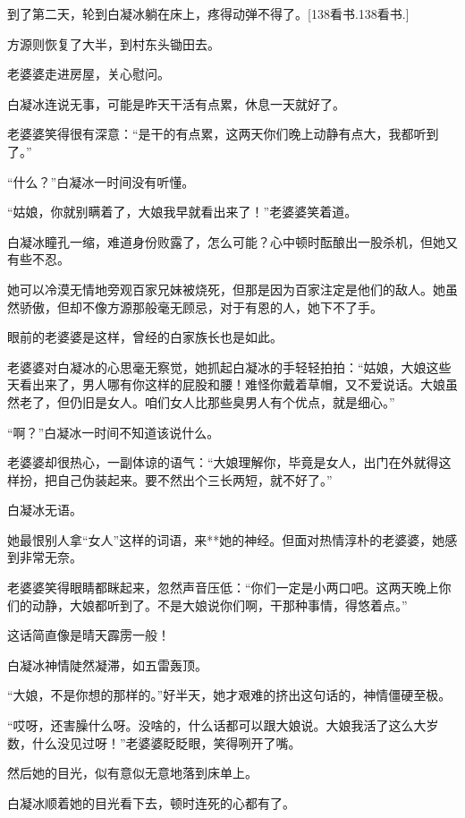 
\begin{this_body}

到了第二天，轮到白凝冰躺在床上，疼得动弹不得了。[138看书.138看书.]

方源则恢复了大半，到村东头锄田去。

老婆婆走进房屋，关心慰问。

白凝冰连说无事，可能是昨天干活有点累，休息一天就好了。

老婆婆笑得很有深意：“是干的有点累，这两天你们晚上动静有点大，我都听到了。”

“什么？”白凝冰一时间没有听懂。

“姑娘，你就别瞒着了，大娘我早就看出来了！”老婆婆笑着道。

白凝冰瞳孔一缩，难道身份败露了，怎么可能？心中顿时酝酿出一股杀机，但她又有些不忍。

她可以冷漠无情地旁观百家兄妹被烧死，但那是因为百家注定是他们的敌人。她虽然骄傲，但却不像方源那般毫无顾忌，对于有恩的人，她下不了手。

眼前的老婆婆是这样，曾经的白家族长也是如此。

老婆婆对白凝冰的心思毫无察觉，她抓起白凝冰的手轻轻拍拍：“姑娘，大娘这些天看出来了，男人哪有你这样的屁股和腰！难怪你戴着草帽，又不爱说话。大娘虽然老了，但仍旧是女人。咱们女人比那些臭男人有个优点，就是细心。”

“啊？”白凝冰一时间不知道该说什么。

老婆婆却很热心，一副体谅的语气：“大娘理解你，毕竟是女人，出门在外就得这样扮，把自己伪装起来。要不然出个三长两短，就不好了。”

白凝冰无语。

她最恨别人拿“女人”这样的词语，来**她的神经。但面对热情淳朴的老婆婆，她感到非常无奈。

老婆婆笑得眼睛都眯起来，忽然声音压低：“你们一定是小两口吧。这两天晚上你们的动静，大娘都听到了。不是大娘说你们啊，干那种事情，得悠着点。”

这话简直像是晴天霹雳一般！

白凝冰神情陡然凝滞，如五雷轰顶。

“大娘，不是你想的那样的。”好半天，她才艰难的挤出这句话的，神情僵硬至极。

“哎呀，还害臊什么呀。没啥的，什么话都可以跟大娘说。大娘我活了这么大岁数，什么没见过呀！”老婆婆眨眨眼，笑得咧开了嘴。

然后她的目光，似有意似无意地落到床单上。

白凝冰顺着她的目光看下去，顿时连死的心都有了。


\end{this_body}

